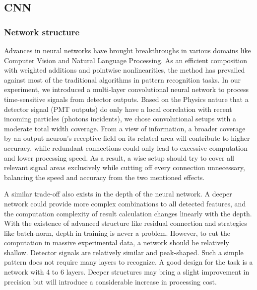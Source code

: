 \subsection{CNN}

\subsubsection{Network structure}

Advances in neural networks have brought breakthroughs in various domains like Computer Vision and Natural Language Processing. As an efficient composition with weighted additions and pointwise nonlinearities, the method has prevailed against most of the traditional algorithms in pattern recognition tasks. In our experiment, we introduced a multi-layer convolutional neural network to process time-sensitive signals from detector outputs. Based on the Physics nature that a detector signal (PMT outputs) do only have a local correlation with recent incoming particles (photons incidents), we chose convolutional setups with a moderate total width coverage. From a view of information, a broader coverage by an output neuron's receptive field on its related area will contribute to higher accuracy, while redundant connections could only lead to excessive computation and lower processing speed. As a result, a wise setup should try to cover all relevant signal areas exclusively while cutting off every connection unnecessary, balancing the speed and accuracy from the two mentioned effects.

A similar trade-off also exists in the depth of the neural network. A deeper network could provide more complex combinations to all detected features, and the computation complexity of result calculation changes linearly with the depth. With the existence of advanced structure like residual connection and strategies like batch-norm, depth in training is never a problem. However, to cut the computation in massive experimental data, a network should be relatively shallow. Detector signals are relatively similar and peak-shaped. Such a simple pattern does not require many layers to recognize. A good design for the task is a network with 4 to 6 layers. Deeper structures may bring a slight improvement in precision but will introduce a considerable increase in processing cost.

